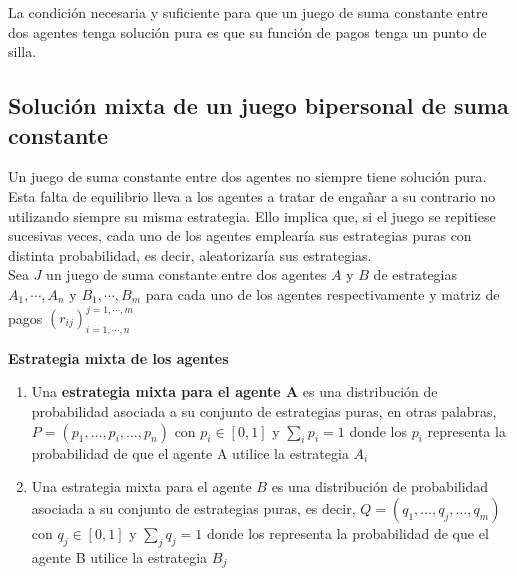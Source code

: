 \begin{proposicion}
La condición necesaria y suficiente para que un juego de suma constante entre dos agentes tenga solución pura es que su función de pagos tenga un punto de silla.
\end{proposicion}

\subsection{Solución mixta de un juego bipersonal de suma constante}
Un juego de suma constante entre dos agentes no siempre tiene solución pura. Esta falta de equilibrio lleva a los agentes a tratar de engañar a su contrario no utilizando siempre su misma estrategia. Ello implica que, si el juego se repitiese sucesivas veces, cada uno de los agentes emplearía sus estrategias puras con distinta probabilidad, es decir, aleatorizaría  sus estrategias. 
\\
Sea $J$  un juego de suma constante entre dos agentes  $A$ y $B$ de estrategias $A_1, \cdots, A_n$ y $B_1, \cdots, B_m$ para cada uno de los agentes respectivamente y matriz de pagos $\left( r_{ij}\right)_{i=1, \cdots ,n}^{j=1, \cdots, m}$

\begin{definicion}\label{Def:Estr_mix}
\textbf{Estrategia mixta de los agentes}
\begin{enumerate}
    \item Una  \textbf{estrategia mixta para el agente A} es una distribución de probabilidad asociada a su conjunto de estrategias puras, en otras palabras, $P = (p_1,\ldots,p_i, \ldots,p_n)$ con $p_i \in [0,1]$ y $\underset{i}{\sum}p_i = 1$ donde los $p_i$ representa la probabilidad de que el agente A utilice la estrategia $A_i$
    \item Una  estrategia mixta para el agente $B$ es una distribución de probabilidad asociada a su conjunto de estrategias puras, es decir, $Q = (q_1,\ldots,q_j,\ldots,q_m)$ con $q_j \in [0,1]$ y $\underset{j}{\sum}q_j = 1$ donde los  representa la probabilidad de que el agente B utilice la estrategia $B_j$
\end{enumerate}
\end{definicion}

